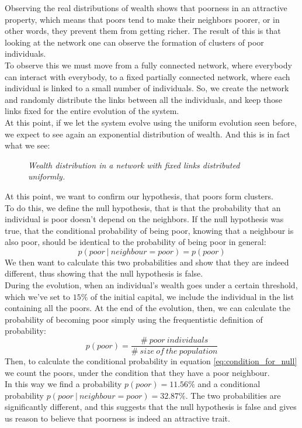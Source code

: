 Observing the real distributions of wealth shows that poorness in an attractive property, which means that poors tend to make their neighbors poorer, or in other words, they prevent them from getting richer. The result of this is that looking at the network one can observe the formation of clusters of poor individuals. \\
To observe this we must move from a fully connected network, where everybody can interact with everybody, to a fixed partially connected network, where each individual is linked to a small number of individuals. So, we create the network and randomly distribute the links between all the individuals, and keep those links fixed for the entire evolution of the system. \\
At this point, if we let the system evolve using the uniform evolution seen before, we expect to see again an exponential distribution of wealth. And this is in fact what we see:
\begin{figure}[ht!]
    \centering
    \scalebox{.7}{}
    \caption{\emph{Wealth distribution in a network with fixed links distributed uniformly.}}
    \label{fig:fixedExpo}
\end{figure}
At this point, we want to confirm our hypothesis, that poors form clusters. \\
To do this, we define the null hypothesis, that is that the probability that an individual is poor doesn't depend on the neighbors. If the null hypothesis was true, that the conditional probability of being poor, knowing that a neighbour is also poor, should be identical to the probability of being poor in general:
$$
	p(poor \ | \ neighbour=poor) = p(poor)
	\label{eq:condition_for_null}
$$
We then want to calculate this two probabilities and show that they are indeed different, thus showing that the null hypothesis is false. \\
During the evolution, when an individual's wealth goes under a certain threshold, which we've set to $15 \%$ of the initial capital, we include the individual in the list containing all the poors. At the end of the evolution, then, we can calculate the probability of becoming poor simply using the frequentistic definition of probability:
$$
	p(poor) = \frac{\# \ poor \ individuals}{\# \ size \ of \ the \ population}
$$
Then, to calculate the conditional probability in equation \ref{eq:condition_for_null} we count the poors, under the condition that they have a poor neighbour. \\
In this way we find a probability $p(poor) = 11.56 \%$ and a conditional probability $p(poor \ | \ neighbour=poor) = 32.87 \%$. The two probabilities are significantly different, and this suggests that the null hypothesis is false and gives us reason to believe that poorness is indeed an attractive trait.
